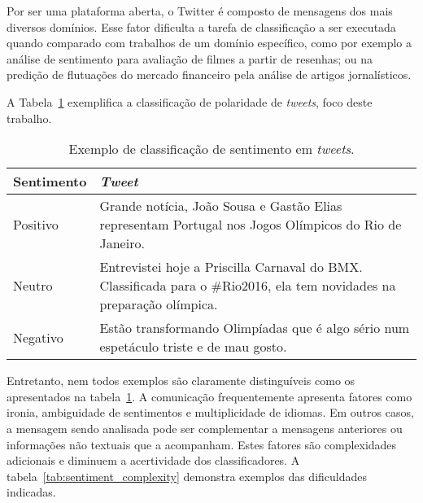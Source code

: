 Por ser uma plataforma aberta, o Twitter é composto de mensagens dos mais diversos domínios.
Esse fator dificulta a tarefa de classificação a ser executada quando comparado com trabalhos de um domínio específico,
como por exemplo a análise de sentimento para avaliação de filmes a partir de resenhas; ou na predição de flutuações do
mercado financeiro pela análise de artigos jornalísticos.

A Tabela~\ref{tab:sentiment} exemplifica a classificação de polaridade de \textit{tweets}, foco deste trabalho.

\begin{table}[h]
    \begin{center}
        \begin{tabular}{| l | p{10cm} |}
        \hline
        \textbf{Sentimento} & \textbf{\textit{Tweet}} \\ \hline
        Positivo & Grande notícia, João Sousa e Gastão Elias representam Portugal nos Jogos Olímpicos do Rio de Janeiro.
        \\ \hline
        Neutro & Entrevistei hoje a Priscilla Carnaval do BMX. Classificada para o \#Rio2016, ela tem novidades na
        preparação olímpica. \\ \hline
        Negativo & Estão transformando Olimpíadas que é algo sério num espetáculo triste e de mau gosto. \\ \hline
        \end{tabular}
        \caption{Exemplo de classificação de sentimento em \textit{tweets}.}
        \label{tab:sentiment}
    \end{center}
\end{table}

Entretanto, nem todos exemplos são claramente distinguíveis como os apresentados na tabela~\ref{tab:sentiment}.
A comunicação frequentemente apresenta fatores como ironia, ambiguidade de sentimentos e multiplicidade de idiomas.
Em outros casos, a mensagem sendo analisada pode ser complementar a mensagens anteriores ou informações não textuais
que a acompanham.
Estes fatores são complexidades adicionais e diminuem a acertividade dos classificadores.
A tabela~\ref{tab:sentiment_complexity} demonstra exemplos das dificuldades indicadas.

